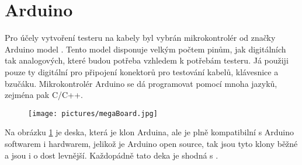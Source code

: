 
\section{Arduino}
Pro účely vytvoření testeru na kabely byl vybrán mikrokontrolér od značky Arduino model \ardMeg. Tento model disponuje velkým počtem pinům, jak digitálních tak analogových, které budou potřeba vzhledem k potřebám testeru. Já použiji pouze ty digitální pro připojení konektorů pro testování kabelů, klávesnice a bzučáku. Mikrokontrolér Arduino se dá programovat pomocí mnoha jazyků, zejména pak C/C++.

\begin{figure}[H]
	\centering
	\texttt{[image: pictures/megaBoard.jpg]}
    	\caption{\ardMeg}
   	\label{fig:arduinoMega}
\end{figure}

Na obrázku \ref{fig:arduinoMega} je deska, která je klon Arduina, ale je plně kompatibilní s Arduino softwarem i hardwarem, jelikož je Arduino open source, tak jsou tyto klony běžné a jsou i o dost levnější. Každopádně tato deka je shodná s \ardMeg.